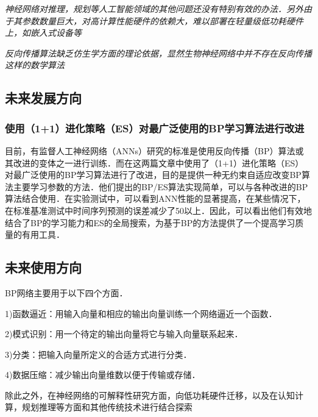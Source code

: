 \emph{神经网络对推理，规划等人工智能领域的其他问题还没有特别有效的办法．另外由于其参数数量巨大，对高计算性能硬件的依赖大，难以部署在轻量级低功耗硬件上，如嵌入式设备等}

\emph{反向传播算法缺乏仿生学方面的理论依据，显然生物神经网络中并不存在反向传播这样的数学算法}
\subsection{未来发展方向}
\subsubsection{使用（1+1）进化策略（ES）对最广泛使用的BP学习算法进行改进}
目前，有监督人工神经网络（ANNs）研究的标准是使用反向传播（BP）算法或其改进的变体之一进行训练．而在这两篇文章中使用了（1+1）进化策略（ES）对最广泛使用的BP学习算法进行了改进，目的是提供一种无约束自适应改变BP算法主要学习参数的方法．他们提出的BP/ES算法实现简单，可以与各种改进的BP算法结合使用．在实验测试中，可以看到ANN性能的显著提高，在某些情况下，在标准基准测试中时间序列预测的误差减少了50以上．因此，可以看出他们有效地结合了BP的学习能力和ES的全局搜索，为基于BP的方法提供了一个提高学习质量的有用工具．
\subsection{未来使用方向}
BP网络主要用于以下四个方面．

1)函数逼近：用输入向量和相应的输出向量训练一个网络逼近一个函数．

2)模式识别：用一个待定的输出向量将它与输入向量联系起来．

3)分类：把输入向量所定义的合适方式进行分类．

4)数据压缩：减少输出向量维数以便于传输或存储．

除此之外，在神经网络的可解释性研究方面，向低功耗硬件迁移，以及在认知计算，规划推理等方面和其他传统技术进行结合探索





